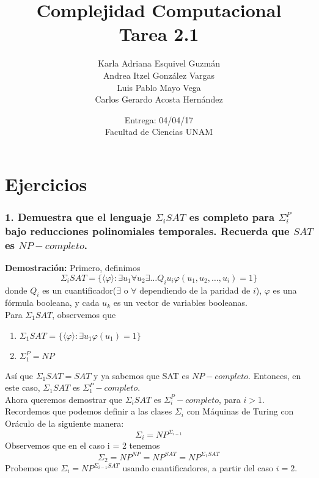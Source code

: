 \documentclass[12pt]{article}
\title{Complejidad Computacional \\ Tarea 2.1}
\author{Karla Adriana Esquivel Guzmán \\ Andrea Itzel González Vargas\\ Luis Pablo Mayo Vega \\ Carlos Gerardo Acosta Hernández}
\date{Entrega: 04/04/17 \\ Facultad de Ciencias UNAM}
\begin{document}
\maketitle
\section*{Ejercicios}
\subsubsection*{1. Demuestra que el lenguaje $\Sigma _iSAT$ es completo para $\Sigma ^P_i$ bajo reducciones polinomiales
temporales. Recuerda que $SAT$ es $NP-completo$.}
\textbf{Demostración:}
Primero, definimos  
\begin{equation*} \label{eq:1}
 \Sigma _{i}SAT = \{ \langle \varphi \rangle : \exists u_1 \forall u_2 \exists \dots Q_{i}u_{i}\varphi(u_1,u_2,\dots,u_{i}) = 1 \}
\end{equation*}
donde $Q_{i}$ es un cuantificador($\exists$ o $\forall$ dependiendo de la paridad de $i$), $\varphi$ es una fórmula booleana, y cada $u_k$ es un vector de variables booleanas.\\

Para $\Sigma_1SAT$, observemos que
\begin{enumerate}
\item $\Sigma_1SAT$ = $\{ \langle \varphi \rangle : \exists u_1 \varphi(u_1) = 1 \}$ 
\item $\Sigma^P_1 = NP$
\end{enumerate}
Así que $\Sigma _1SAT = SAT$ y ya sabemos que SAT es $NP-completo$. Entonces, en este caso, $\Sigma_1SAT$ es $\Sigma^P_1-completo$. \\

Ahora queremos demostrar que $\Sigma _{i}SAT$ es $\Sigma^P_{i}-completo$, para $i > 1$.\\
Recordemos que podemos definir a las clases $\Sigma_i$ con Máquinas de Turing con Oráculo de la siguiente manera: \\
\begin{equation*}
\Sigma_i = NP^{\Sigma_{i-1}}
\end{equation*} 
Observemos que en el caso i = 2 tenemos \\
\begin{equation*}
\Sigma_2 = NP^{NP} = NP^{SAT} = NP^{\Sigma_1SAT}
\end{equation*}
Probemos que $\Sigma_i = NP^{\Sigma_{i-1}SAT}$ usando cuantificadores, a partir del caso $i=2$.\\
\end{document}
